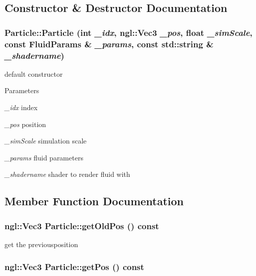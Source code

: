 \subsection{Constructor \& Destructor Documentation}
\hypertarget{classParticle_ac6f39cecbf6d1995e2167dacbc0ca5ae}{
\subsubsection[{Particle}]{\setlength{\rightskip}{0pt plus 5cm}Particle::Particle (int {\em \_\-idx}, \/  ngl::Vec3 {\em \_\-pos}, \/  float {\em \_\-simScale}, \/  const {\bf FluidParams} \& {\em \_\-params}, \/  const std::string \& {\em \_\-shadername})}}
\label{classParticle_ac6f39cecbf6d1995e2167dacbc0ca5ae}


default constructor 
\begin{DoxyParams}{Parameters}
\item[{\em \_\-idx}]index \item[{\em \_\-pos}]position \item[{\em \_\-simScale}]simulation scale \item[{\em \_\-params}]fluid parameters \item[{\em \_\-shadername}]shader to render fluid with \end{DoxyParams}


\subsection{Member Function Documentation}
\hypertarget{classParticle_a65eba0070673cb425a23a8a8496f6a17}{
\subsubsection[{getOldPos}]{\setlength{\rightskip}{0pt plus 5cm}ngl::Vec3 Particle::getOldPos () const}}
\label{classParticle_a65eba0070673cb425a23a8a8496f6a17}


get the previousposition \hypertarget{classParticle_a3c5efd4bc52c177c06439fc9eafe3438}{
\subsubsection[{getPos}]{\setlength{\rightskip}{0pt plus 5cm}ngl::Vec3 Particle::getPos () const}}
\label{classParticle_a3c5efd4bc52c177c06439fc9eafe3438}


